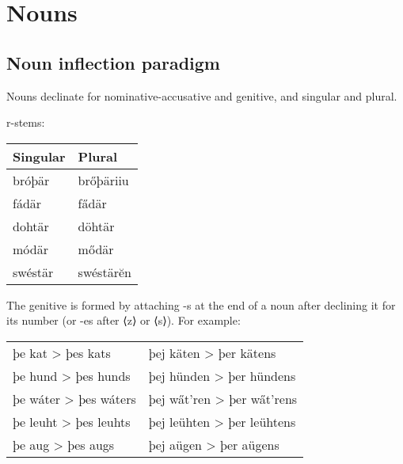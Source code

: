 \section{Nouns}

\subsection{Noun inflection paradigm}

Nouns declinate for nominative-accusative and genitive, and singular and plural.

r-stems:

\begin{center}
\begin{tabular}{ll}
Singular & Plural \\
\hline
bróþär  & brőþäriiu \\
fádär   & fa̋där \\
dohtär  & döhtär \\
módär   & mődär \\
swéstär & swéstärĕn \\
\end{tabular}
\end{center}

The genitive is formed by attaching -s at the end of a noun after declining it for its number (or -es after ⟨z⟩ or ⟨s⟩). For example:

\begin{center}
\begin{tabular}{l|l}
þe kat > þes kats     & þej käten > þer kätens  \\
þe hund > þes hunds   & þej hünden > þer hündens \\
þe wáter > þes wáters & þej w\H{a}t'ren > þer w\H{a}t'rens \\
þe leuht > þes leuhts & þej leühten > þer leühtens \\
þe aug > þes augs     & þej aügen > þer aügens \\
\end{tabular}
\end{center}
